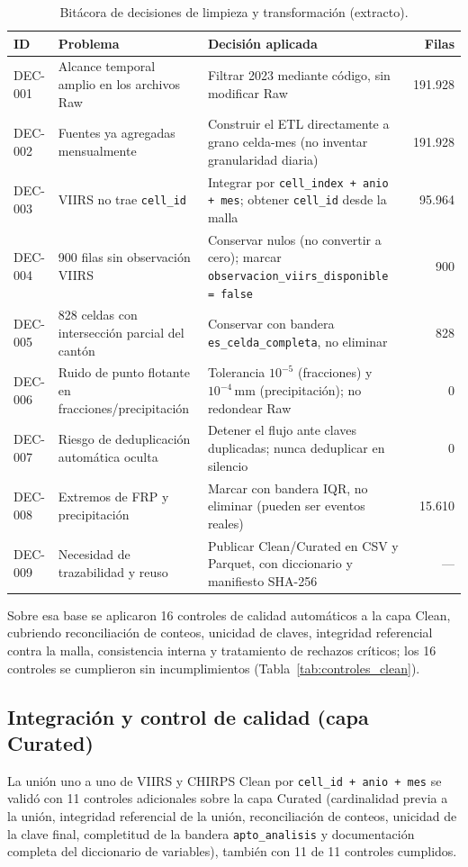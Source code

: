 \documentclass[11pt,a4paper]{article}
\begin{document}
\begin{table}[H]
\centering
\scriptsize
\caption{Bit\'acora de decisiones de limpieza y transformaci\'on (extracto).}
\label{tab:bitacora_decisiones}
\begin{tabularx}{\textwidth}{@{}lXXr@{}}
\toprule
\textbf{ID} & \textbf{Problema} & \textbf{Decisi\'on aplicada} & \textbf{Filas} \\
\midrule
DEC-001 & Alcance temporal amplio en los archivos Raw & Filtrar 2023 mediante c\'odigo, sin modificar Raw & 191.928 \\
DEC-002 & Fuentes ya agregadas mensualmente & Construir el ETL directamente a grano celda-mes (no inventar granularidad diaria) & 191.928 \\
DEC-003 & VIIRS no trae \texttt{cell\_id} & Integrar por \texttt{cell\_index + anio + mes}; obtener \texttt{cell\_id} desde la malla & 95.964 \\
DEC-004 & 900 filas sin observaci\'on VIIRS & Conservar nulos (no convertir a cero); marcar \texttt{observacion\_viirs\_disponible = false} & 900 \\
DEC-005 & 828 celdas con intersecci\'on parcial del cant\'on & Conservar con bandera \texttt{es\_celda\_completa}, no eliminar & 828 \\
DEC-006 & Ruido de punto flotante en fracciones/precipitaci\'on & Tolerancia $10^{-5}$ (fracciones) y $10^{-4}$\,mm (precipitaci\'on); no redondear Raw & 0 \\
DEC-007 & Riesgo de deduplicaci\'on autom\'atica oculta & Detener el flujo ante claves duplicadas; nunca deduplicar en silencio & 0 \\
DEC-008 & Extremos de FRP y precipitaci\'on & Marcar con bandera IQR, no eliminar (pueden ser eventos reales) & 15.610 \\
DEC-009 & Necesidad de trazabilidad y reuso & Publicar Clean/Curated en CSV y Parquet, con diccionario y manifiesto SHA-256 & --- \\
\bottomrule
\end{tabularx}
\end{table}

Sobre esa base se aplicaron 16 controles de calidad autom\'aticos a la capa Clean, cubriendo reconciliaci\'on de conteos, unicidad de claves, integridad referencial contra la malla, consistencia interna y tratamiento de rechazos cr\'iticos; los 16 controles se cumplieron sin incumplimientos (Tabla~\ref{tab:controles_clean}).

\subsection{Integraci\'on y control de calidad (capa Curated)}
La uni\'on uno a uno de VIIRS y CHIRPS Clean por \texttt{cell\_id + anio + mes} se valid\'o con 11 controles adicionales sobre la capa Curated (cardinalidad previa a la uni\'on, integridad referencial de la uni\'on, reconciliaci\'on de conteos, unicidad de la clave final, completitud de la bandera \texttt{apto\_analisis} y documentaci\'on completa del diccionario de variables), tambi\'en con 11 de 11 controles cumplidos.
\end{document}
